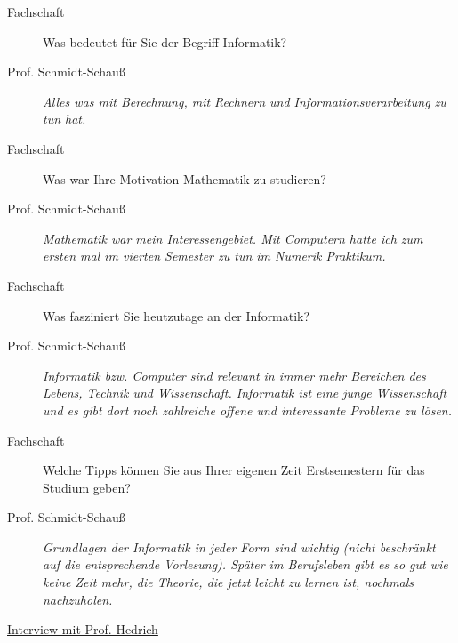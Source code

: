 \begin{description}

\item[Fachschaft]

Was bedeutet für Sie der Begriff Informatik?

\item[Prof. Schmidt-Schauß]

\textit{Alles was mit  Berechnung, mit Rechnern und Informationsverarbeitung zu tun hat.}

\item[Fachschaft]

Was war Ihre Motivation Mathematik zu studieren?

\item[Prof. Schmidt-Schauß]

\textit{Mathematik war mein Interessengebiet. Mit Computern hatte ich zum ersten mal im vierten Semester zu tun im Numerik Praktikum.}

\item[Fachschaft]

Was fasziniert Sie heutzutage an der Informatik?

\item[Prof. Schmidt-Schauß]

\textit{Informatik bzw. Computer sind relevant in immer mehr Bereichen des Lebens, Technik und Wissenschaft.
Informatik ist eine junge Wissenschaft und es gibt dort noch zahlreiche offene und interessante Probleme zu lösen.}

\item[Fachschaft]

Welche Tipps können Sie aus Ihrer eigenen Zeit Erstsemestern für das Studium geben?

\item[Prof. Schmidt-Schauß]

\textit{Grundlagen der Informatik in jeder Form sind wichtig (nicht beschränkt auf die entsprechende Vorlesung). Später im Berufsleben gibt es so gut wie keine Zeit mehr, die Theorie, die jetzt leicht zu lernen ist, nochmals nachzuholen.}

\end{description}


\begin{flushleft}\underline{Interview mit Prof. Hedrich} \end{flushleft}

